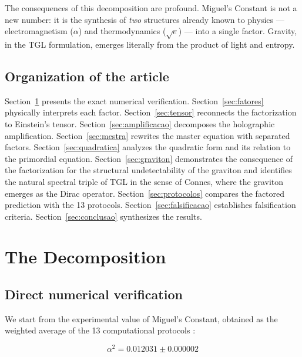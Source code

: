 \documentclass[12pt,a4paper,twoside]{article}
\newcommand{\alphaii}{\alpha^{2}}
\begin{document}
The consequences of this decomposition are profound. Miguel's Constant is not a new number: it is the synthesis of \textit{two} structures already known to physics --- electromagnetism ($\alpha$) and thermodynamics ($\sqrt{e}$) --- into a single factor. Gravity, in the TGL formulation, emerges literally from the product of light and entropy.

\subsection{Organization of the article}

Section~\ref{sec:decomposicao} presents the exact numerical verification. Section~\ref{sec:fatores} physically interprets each factor. Section~\ref{sec:tensor} reconnects the factorization to Einstein's tensor. Section~\ref{sec:amplificacao} decomposes the holographic amplification. Section~\ref{sec:mestra} rewrites the master equation with separated factors. Section~\ref{sec:quadratica} analyzes the quadratic form and its relation to the primordial equation. Section~\ref{sec:graviton} demonstrates the consequence of the factorization for the structural undetectability of the graviton and identifies the natural spectral triple of TGL in the sense of Connes, where the graviton emerges as the Dirac operator. Section~\ref{sec:protocolos} compares the factored prediction with the 13 protocols. Section~\ref{sec:falsificacao} establishes falsification criteria. Section~\ref{sec:conclusao} synthesizes the results.



\section{The Decomposition}
\label{sec:decomposicao}

\subsection{Direct numerical verification}

We start from the experimental value of Miguel's Constant, obtained as the weighted average of the 13 computational protocols \cite{Miguel2026Fronteira}:

\begin{equation}
\alphaii = 0.012031 \pm 0.000002
\end{equation}
\end{document}
